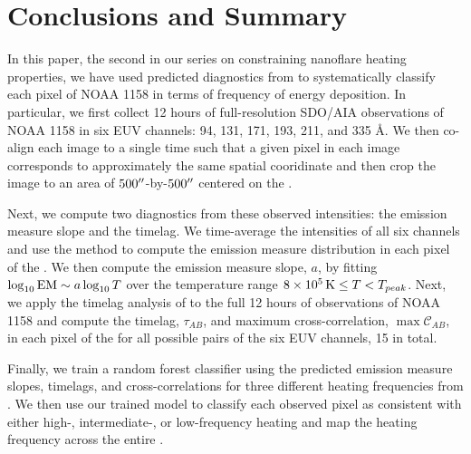 \section{Conclusions and Summary}\label{sec:conclusions}

In this paper, the second in our series on constraining nanoflare heating properties, we have used predicted diagnostics from  to systematically classify each pixel of \AR{} NOAA 1158 in terms of frequency of energy deposition. In particular, we first collect 12 hours of full-resolution SDO/AIA observations of NOAA 1158 in six EUV channels: 94, 131, 171, 193, 211, and 335 \AA. We then co-align each image to a single time such that a given pixel in each image corresponds to approximately the same spatial cooridinate and then crop the image to an area of $500\mbox{$^{\prime\prime}$}$-by-$500\mbox{$^{\prime\prime}$}$ centered on the \AR{}.

Next, we compute two diagnostics from these observed intensities: the emission measure slope and the timelag. We time-average the intensities of all six channels and use the method \citet{hannah_differential_2012} to compute the emission measure distribution in each pixel of the \AR{}. We then compute the emission measure slope, $a$, by fitting $\log_{10}\textup{EM}\sim a\log_{10}T$ over the temperature range $8\times10^5\,\textup{K}\le T < T_{peak}$. Next, we apply the timelag analysis of \citet{viall_evidence_2012} to the full 12 hours of observations of NOAA 1158 and compute the timelag, $\tau_{AB}$, and maximum cross-correlation, $\max\mathcal{C}_{AB}$, in each pixel of the \AR{} for all possible pairs of the six EUV channels, 15 in total.

Finally, we train a random forest classifier using the predicted emission measure slopes, timelags, and cross-correlations for three different heating frequencies from . We then use our trained model to classify each observed pixel as consistent with either high-, intermediate-, or low-frequency heating and map the heating frequency across the entire \AR{}.

